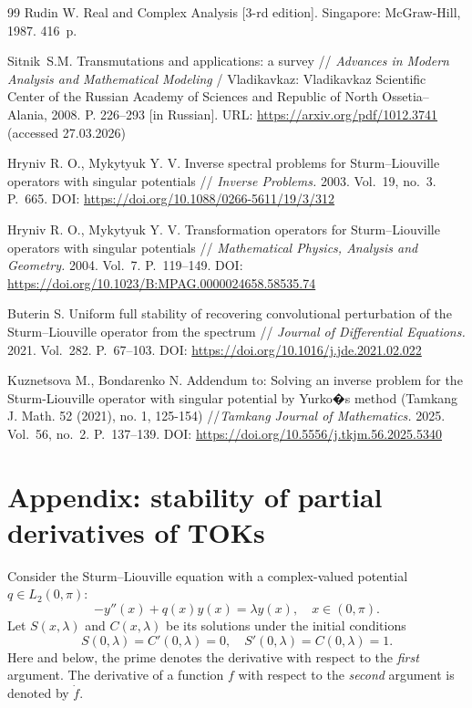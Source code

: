 \documentclass[a4paper, 12pt] {article}
\theoremstyle{plain}
\theoremstyle{remark}
\theoremstyle{plain}
\theoremstyle{definition}
\numberwithin{equation}{section}
\begin{document}
\begin{thebibliography}{99}
 Rudin W. {Real and Complex Analysis} [3-rd edition]. Singapore: McGraw-Hill, 1987. 416~p. 


Sitnik~S.M. Transmutations and applications: a survey // {\it Advances in Modern Analysis and Mathematical Modeling} / Vladikavkaz: Vladikavkaz Scientific Center of the Russian Academy of Sciences and Republic of North Ossetia--Alania, 2008. P. 226--293 [in Russian]. URL: \url{https://arxiv.org/pdf/1012.3741} (accessed 27.03.2026)

  Hryniv R. O., Mykytyuk Y. V.  Inverse spectral problems for Sturm--Liouville operators with singular potentials //
{\it  Inverse Problems.} 2003. Vol.~19, no.~3. P.~665. DOI: \url{https://doi.org/10.1088/0266-5611/19/3/312}

 Hryniv R. O., Mykytyuk Y. V. Transformation operators for Sturm--Liouville operators with singular potentials // {\it Mathematical Physics, Analysis and Geometry.} 2004. Vol.~7. P.~119--149. DOI: \url{https://doi.org/10.1023/B:MPAG.0000024658.58535.74}

 Buterin S. Uniform full stability of recovering convolutional perturbation of the Sturm--Liouville operator from the spectrum //
{\it Journal of Differential Equations.} 2021. Vol.~282.
P.~67--103. DOI: \url{https://doi.org/10.1016/j.jde.2021.02.022}

 Kuznetsova M., Bondarenko N. Addendum to: Solving an inverse problem for the Sturm-Liouville operator with singular potential by Yurko�s method (Tamkang J. Math. 52 (2021), no. 1, 125-154) //{\it Tamkang Journal of Mathematics.}  2025. Vol.~56, no.~2. P.~137--139. DOI: \url{https://doi.org/10.5556/j.tkjm.56.2025.5340}

\end{thebibliography}

\section*{Appendix: stability of partial derivatives of TOKs}
\label{App}

Consider the Sturm--Liouville equation with a complex-valued potential $q \in L_2(0, \pi):$
\begin{equation*} 
-y''(x) + q(x) y(x) = \lambda y(x), \quad x \in (0, \pi).
\end{equation*}
Let $S(x, \lambda)$ and $C(x, \lambda)$ be its solutions under the initial conditions
$$S(0, \lambda) = C'(0, \lambda) = 0, \quad S'(0, \lambda) = C(0, \lambda) = 1.$$
Here and below, the prime denotes the derivative with respect to the {\it first} argument.
The derivative of a function $f$ with respect to the {\it second} argument is denoted by $\dot{f}.$
\end{document}
